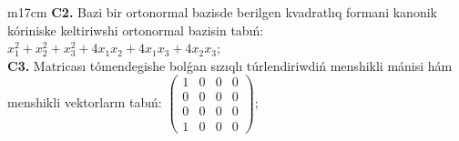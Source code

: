 \documentclass{article}
\begin{document}
\begin{tabular}{m{17cm}}
\textbf{C2.} Bazi bir ortonormal bazisde berilgen kvadratlıq formani kanonik kóriniske keltiriwshi ortonormal bazisin tabıń: \(x_{1}^{2} + x_{2}^{2} + x_{3}^{2} + 4x_{1}x_{2} + 4x_{1}x_{3} + 4x_{2}x_{3}\); \\
\textbf{C3.} Matricası tómendegishe bolǵan sızıqlı túrlendiriwdiń menshikli mánisi hám menshikli vektorların tabıń: \(\begin{pmatrix} 1 & 0 & 0 & 0 \\ 0 & 0 & 0 & 0 \\ 0 & 0 & 0 & 0 \\ 1 & 0 & 0 & 0 \end{pmatrix}\); \\

\end{tabular}
\vspace{1cm}
\end{document}
